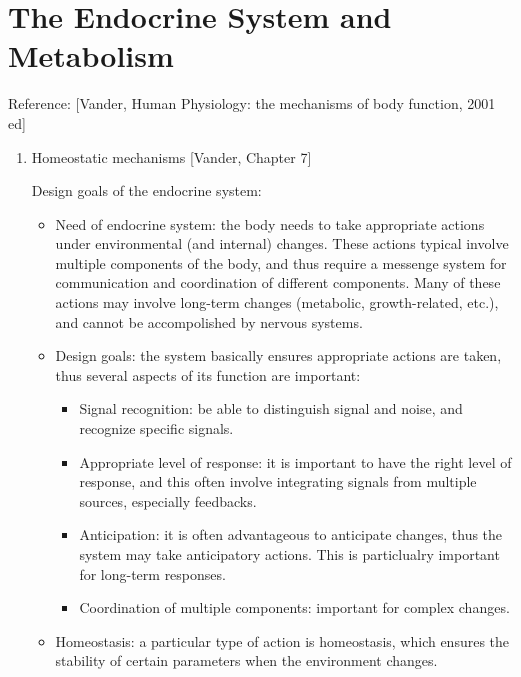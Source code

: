 \documentclass{report}
\begin{document}
\section{The Endocrine System and Metabolism}

Reference: [Vander, Human Physiology: the mechanisms of body function, 2001 ed]

\begin{enumerate}
\item{Homeostatic mechanisms} [Vander, Chapter 7]

Design goals of the endocrine system: 
\begin{itemize}
\item Need of endocrine system: the body needs to take appropriate actions under environmental (and internal) changes. These actions typical involve multiple components of the body, and thus require a messenge system for communication and coordination of different components. Many of these actions may involve long-term changes (metabolic, growth-related, etc.), and cannot be accompolished by nervous systems. 

\item Design goals: the system basically ensures appropriate actions are taken, thus several aspects of its function are important: 
\begin{itemize}
	\item Signal recognition: be able to distinguish signal and noise, and recognize specific signals. 
	\item Appropriate level of response: it is important to have the right level of response, and this often involve integrating signals from multiple sources, especially feedbacks. 
	\item Anticipation: it is often advantageous to anticipate changes, thus the system may take anticipatory actions. This is particlualry important for long-term responses. 
	\item Coordination of multiple components: important for complex changes. 
\end{itemize}

\item Homeostasis: a particular type of action is homeostasis, which ensures the stability of certain parameters when the environment changes. 
\end{itemize}


\end{enumerate}
\end{document}
